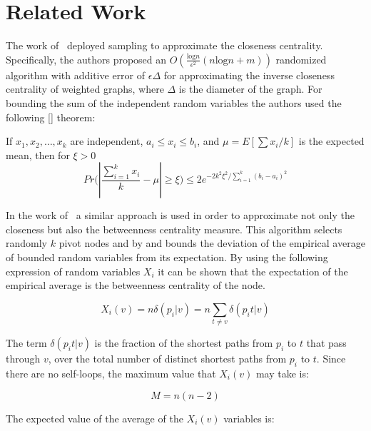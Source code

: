 \section{Related Work}\label{sec:prevwork}

The work of~\citet{EppsteinW04} deployed sampling to approximate the closeness centrality.
Specifically, the authors proposed an $O(\frac{\mbox{log}n}{\epsilon^2}(n\mbox{log}n+m))$ randomized algorithm with additive error of $\epsilon \Delta$ for approximating the inverse closeness centrality of weighted graphs, where $\Delta$ is the diameter of the graph.
For bounding the sum of the independent random variables the authors used the following [] theorem:

\begin{theorem}
If $x_{1},x_{2},\ldots,x_{k}$ are independent, $a_{i}\leq x_{i}\leq b_{i}$, and $\mu=E[\sum x_{i}/k]$ is the expected mean, then for $\xi > 0$
\begin{displaymath}
Pr\Big( |\frac{\sum_{i=1}^{k}x_{i}}{k}-\mu|\geq \xi\Big)\leq 2e^{-2k^2\xi^2/\sum_{i=1}^{k}(b_{i}-a_{i})^2}
\end{displaymath}
\end{theorem}

In the work of~\citet{BrandesP07} a similar approach is used in order to approximate not only the closeness but also the betweenness centrality measure.
This algorithm selects randomly $k$ pivot nodes and by and bounds the deviation of the empirical average of bounded random variables from its expectation.
By using the following expression of random variables $X_{i}$ it can be shown that the expectation of the empirical average is the betweenness centrality of the node.

\begin{displaymath}
X_{i}(v)=n\delta (p_{i}|v)=n\sum_{t\neq v}\delta (p_{i}t|v)
\end{displaymath}

The term $\delta (p_{i}t|v)$ is the fraction of the shortest paths from $p_{i}$ to $t$ that pass through $v$, over the total number of distinct shortest paths from 
$p_{i}$ to $t$.
Since there are no self-loops, the maximum value that $X_{i}(v)$ may take is:

\begin{displaymath}
M=n(n-2)
\end{displaymath}

The expected value of the average of the $X_{i}(v)$ variables is:

